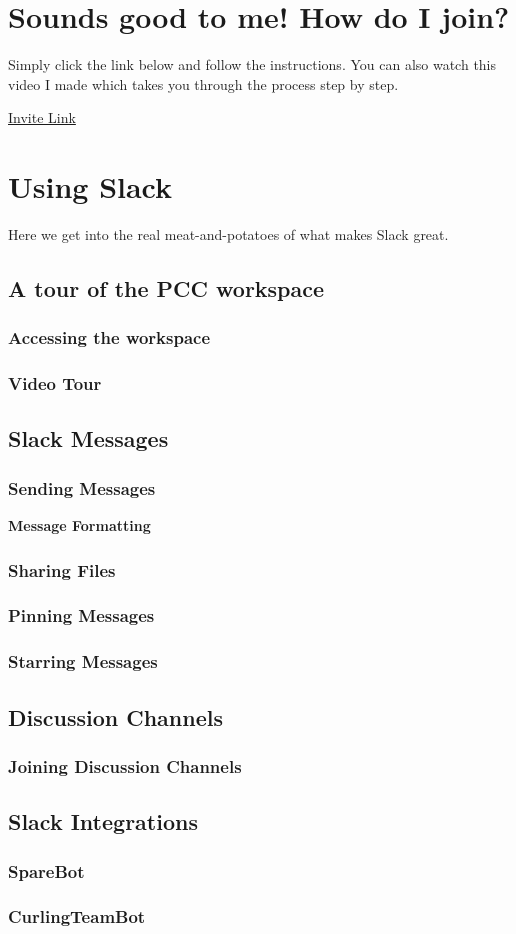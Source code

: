 \documentclass[12pt]{scrartcl}
\newcommand{\n}{\newline}
\begin{document}
	\section{Sounds good to me!  How do I join?}
	Simply click the link below and follow the instructions.  You can also watch this video I made which takes you through the process step by step.\n
	
	\href{https://join.slack.com/t/curldc/shared_invite/enQtNDQwODk2MDA0NTMzLTZkOWJmYjU4N2ZmMTFlMmExZmE1ZjU4NGY1ZTFkZTU1NTRjYjZkNGUyMWQ0ZjhlODZkNTU0MTg1ZTFmYTY1NDA}{Invite Link}
	
	
	\section{Using Slack}
	Here we get into the real meat-and-potatoes of what makes Slack great.  
	\subsection{A tour of the PCC workspace}
		\subsubsection{Accessing the workspace}
		\subsubsection{Video Tour}
	\subsection{Slack Messages}
		\subsubsection{Sending Messages}
		\textbf{Message Formatting}
		\subsubsection{Sharing Files}
		\subsubsection{Pinning Messages}
		\subsubsection{Starring Messages}
	\subsection{Discussion Channels}
		\subsubsection{Joining Discussion Channels}
	\subsection{Slack Integrations}
		\subsubsection{SpareBot}
		\subsubsection{CurlingTeamBot}
	
	
\end{document}
